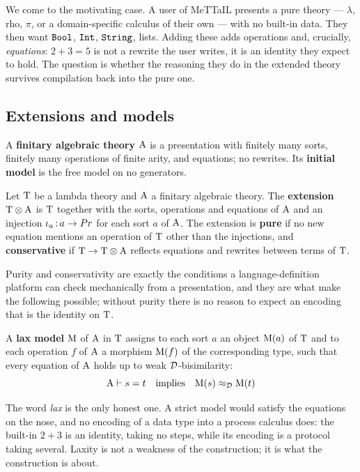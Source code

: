 \documentclass{article}
\begin{document}
We come to the motivating case. A user of MeTTaIL presents a pure theory --- $\lambda$, rho, $\pi$, or a domain-specific calculus of their own --- with no built-in data. They then want $\mathtt{Bool}$, $\mathtt{Int}$, $\mathtt{String}$, lists. Adding these adds operations and, crucially, \emph{equations}: $2+3=5$ is not a rewrite the user writes, it is an identity they expect to hold. The question is whether the reasoning they do in the extended theory survives compilation back into the pure one.

\subsection{Extensions and models}

\begin{definition}
    A \textbf{finitary algebraic theory} $\mathrm{A}$ is a presentation with finitely many sorts, finitely many operations of finite arity, and equations; no rewrites. Its \textbf{initial model} is the free model on no generators.
\end{definition}

\begin{definition}
\label{def:ext}
    Let $\mathrm{T}$ be a lambda theory and $\mathrm{A}$ a finitary algebraic theory. The \textbf{extension} $\mathrm{T}\otimes\mathrm{A}$ is $\mathrm{T}$ together with the sorts, operations and equations of $\mathrm{A}$ and an injection $\iota_a\,{:}\, a\to Pr$ for each sort $a$ of $\mathrm{A}$. The extension is \textbf{pure} if no new equation mentions an operation of $\mathrm{T}$ other than the injections, and \textbf{conservative} if $\mathrm{T}\to\mathrm{T}\otimes\mathrm{A}$ reflects equations and rewrites between terms of $\mathrm{T}$.
\end{definition}

Purity and conservativity are exactly the conditions a language-definition platform can check mechanically from a presentation, and they are what make the following possible; without purity there is no reason to expect an encoding that is the identity on $\mathrm{T}$.

\begin{definition}
\label{def:laxmodel}
    A \textbf{lax model} $\mathrm{M}$ of $\mathrm{A}$ in $\mathrm{T}$ assigns to each sort $a$ an object $\mathrm{M}(a)$ of $\mathrm{T}$ and to each operation $f$ of $\mathrm{A}$ a morphism $\mathrm{M}(f)$ of the corresponding type, such that every equation of $\mathrm{A}$ holds up to weak $\mathcal{D}$-bisimilarity:
    \[\mathrm{A}\vdash s=t \quad\text{implies}\quad \mathrm{M}(s)\approx_{\mathcal{D}}\mathrm{M}(t)\]
\end{definition}

The word \emph{lax} is the only honest one. A strict model would satisfy the equations on the nose, and no encoding of a data type into a process calculus does: the built-in $2+3$ is an identity, taking no steps, while its encoding is a protocol taking several. Laxity is not a weakness of the construction; it is what the construction is about.
\end{document}
